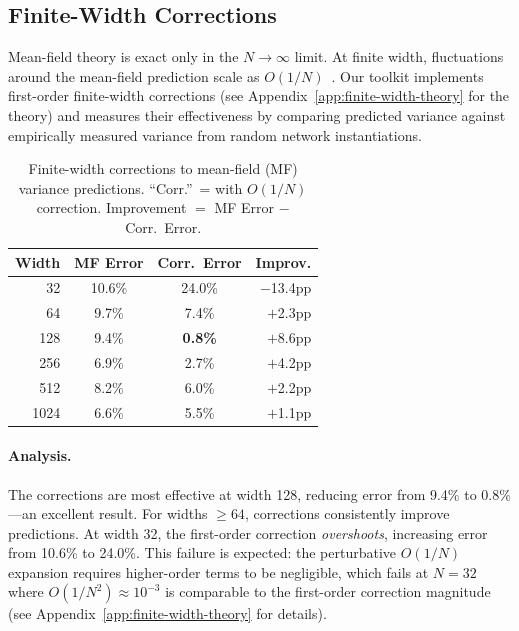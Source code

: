 \documentclass[10pt]{article}
\begin{document}
\subsection{Finite-Width Corrections}
\label{sec:finite-width}

Mean-field theory is exact only in the $N \to \infty$ limit.
At finite width, fluctuations around the mean-field prediction scale as $O(1/N)$~\cite{hanin2018neural}.
Our toolkit implements first-order finite-width corrections (see Appendix~\ref{app:finite-width-theory} for the theory) and measures their effectiveness by comparing predicted variance against empirically measured variance from random network instantiations.

\begin{table}[t]
\centering
\caption{Finite-width corrections to mean-field (MF) variance predictions.  ``Corr.''\ = with $O(1/N)$ correction.  Improvement $= $ MF Error $-$ Corr.\ Error.}
\label{tab:finite-width}
\small
\begin{tabular}{@{}rccr@{}}
\toprule
\textbf{Width} & \textbf{MF Error} & \textbf{Corr.\ Error} & \textbf{Improv.} \\
\midrule
32   & 10.6\% & 24.0\% & $-$13.4pp \\
64   & 9.7\%  & 7.4\%  & $+$2.3pp \\
128  & 9.4\%  & \textbf{0.8\%}  & $+$8.6pp \\
256  & 6.9\%  & 2.7\%  & $+$4.2pp \\
512  & 8.2\%  & 6.0\%  & $+$2.2pp \\
1024 & 6.6\%  & 5.5\%  & $+$1.1pp \\
\bottomrule
\end{tabular}
\end{table}

\paragraph{Analysis.}
The corrections are most effective at width 128, reducing error from 9.4\% to 0.8\%---an excellent result.
For widths $\geq 64$, corrections consistently improve predictions.
At width 32, the first-order correction \emph{overshoots}, increasing error from 10.6\% to 24.0\%.
This failure is expected: the perturbative $O(1/N)$ expansion requires higher-order terms to be negligible, which fails at $N=32$ where $O(1/N^2) \approx 10^{-3}$ is comparable to the first-order correction magnitude (see Appendix~\ref{app:finite-width-theory} for details).
\end{document}
